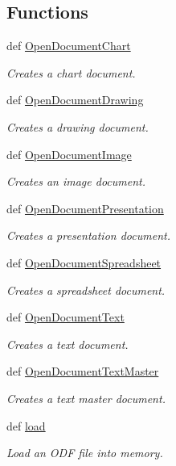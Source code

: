 \subsection*{Functions}
\begin{DoxyCompactItemize}
\item 
def \hyperlink{namespaceodf_1_1opendocument_a6a86bb2e0369feaea53b7c05290b2392}{Open\+Document\+Chart}
\begin{DoxyCompactList}\small\item\em Creates a chart document. \end{DoxyCompactList}\item 
def \hyperlink{namespaceodf_1_1opendocument_a5ff2aeb89ca9dfbae829ee5853c7b3e2}{Open\+Document\+Drawing}
\begin{DoxyCompactList}\small\item\em Creates a drawing document. \end{DoxyCompactList}\item 
def \hyperlink{namespaceodf_1_1opendocument_a3f866df98a777ed31da478c6406d22db}{Open\+Document\+Image}
\begin{DoxyCompactList}\small\item\em Creates an image document. \end{DoxyCompactList}\item 
def \hyperlink{namespaceodf_1_1opendocument_a8a56383489ab849a51711a04de3f0f63}{Open\+Document\+Presentation}
\begin{DoxyCompactList}\small\item\em Creates a presentation document. \end{DoxyCompactList}\item 
def \hyperlink{namespaceodf_1_1opendocument_a6e2d5bd6da597f4b19f6b285d3802d0d}{Open\+Document\+Spreadsheet}
\begin{DoxyCompactList}\small\item\em Creates a spreadsheet document. \end{DoxyCompactList}\item 
def \hyperlink{namespaceodf_1_1opendocument_aa484e380b454031a93c5da214fab392d}{Open\+Document\+Text}
\begin{DoxyCompactList}\small\item\em Creates a text document. \end{DoxyCompactList}\item 
def \hyperlink{namespaceodf_1_1opendocument_af6d010acf6dd4ad33f05b48ce036a208}{Open\+Document\+Text\+Master}
\begin{DoxyCompactList}\small\item\em Creates a text master document. \end{DoxyCompactList}\item 
def \hyperlink{namespaceodf_1_1opendocument_a5f91a599e953a7b3d3cd07ad3a696467}{load}
\begin{DoxyCompactList}\small\item\em Load an O\+D\+F file into memory. \end{DoxyCompactList}\end{DoxyCompactItemize}
